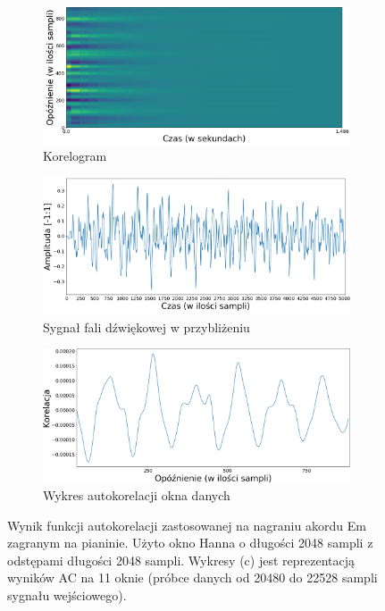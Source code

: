 \documentclass[12pt,a4paper,twoside]{mwart}
\begin{document}
\begin{figure}[ht]
  \begin{subfigure}{1.\textwidth}
    \centering
    \includegraphics[width=.49\linewidth]{images/Em/Corelogram_cropped.png}
    \caption{Korelogram}
  \end{subfigure}
  \newline
  \begin{subfigure}{0.5\textwidth}
    \includegraphics[width=1.\linewidth]{images/Em/waveform_zoom_samples_cropped.png}
    \caption{Sygnał fali dźwiękowej w przybliżeniu}
  \end{subfigure}
  \begin{subfigure}{0.49\textwidth}
    \includegraphics[width=1.\linewidth]{images/Em/corelation_cropped.png}
    \caption{Wykres autokorelacji okna danych}
  \end{subfigure}
  \caption{Wynik funkcji autokorelacji zastosowanej na nagraniu akordu Em zagranym na pianinie. Użyto okno Hanna o długości 2048 sampli z odstępami długości 2048 sampli. Wykresy (c) jest reprezentacją wyników AC na 11 oknie (próbce danych od 20480 do 22528 sampli sygnału wejściowego).}
  \label{fig:multi:ac:em}
\end{figure}
\end{document}
